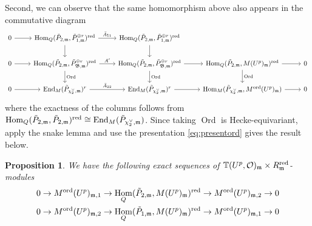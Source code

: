 \documentclass[leqno]{amsart}
\newtheorem{prop}[thm]{Proposition}
\theoremstyle{definition}
\theoremstyle{remark}
\newcommand{\oo}{\mathcal{O}}
\DeclareMathOperator{\End}{End}
\DeclareMathOperator{\Hom}{Hom}
\newcommand{\fm}{\mathfrak{m}}
\DeclareMathOperator{\Ord}{Ord} %
\newcommand{\B}{\mathfrak B} %
\newcommand{\red}{\textnormal{red}}
\newcommand{\TT}{\mathbb{T}} %
\newcommand{\ord}{\textnormal{ord}} %
\begin{document}
Second, we can observe that the same homomorphism 
above also appears in the commutative diagram 
\begin{equation*}
    \begin{tikzcd}
	    0 \arrow[r]& 
	    \Hom_{Q}(\tilde{P}_{2,\fm},\tilde{P}_{1,\fm}^{\oplus r})^{\red}
	    \arrow[r,"\bar{A}_{11}"] \arrow[d]&
	    \Hom_{Q}(\tilde{P}_{2,\fm}, \tilde{P}_{1,\fm}^{\oplus r})^{\red}
	    \arrow[d] &&\\
	    0\arrow[r] & 
	    \Hom_{Q}(\tilde{P}_{2,\fm},\tilde{P}_{\B,\fm}^{\oplus r})^{\red}
	    \arrow[r,"A'"] \arrow[d,"\Ord"] &
	    \Hom_{Q}(\tilde{P}_{2,\fm},\tilde{P}_{\B,\fm}^{\oplus r})^{\red}
	    \arrow[d,"\Ord"] \arrow[r]&
	    \Hom_{Q}(\tilde{P}_{2,\fm}, M(U^p)_{\fm})^{\red}\arrow[r]
        \arrow[d,"\Ord"] &0\\
	    0\arrow[r] & 
	    \End_{M}(\tilde{P}_{\chi_2^\vee,\fm})^{r}
	    \arrow[r,"\bar{A}_{22}"] &
	    \End_{M}(\tilde{P}_{\chi_2^\vee,\fm})^{r}
        \arrow[r]&
        \Hom_{M}(\tilde{P}_{\chi_2^\vee,\fm}, M^{\ord}(U^p)_\fm)
        \arrow[r]&0
    \end{tikzcd}
\end{equation*}
where the exactness of the columns follows from 
$\Hom_{Q}(\tilde{P}_{2,\fm}, \tilde{P}_{2,\fm})^{\red}
\cong \End_{M}(\tilde{P}_{\chi_2^\vee,\fm})$.
Since taking $\Ord$ is Hecke-equivariant,
apply the snake lemma and use the presentation \eqref{eq:presentord}
gives the result below.
\begin{prop}\label{cor:fil_by_ord}
	We have the following exact sequences of
	$\TT(U^p,\oo)_\fm\times R_{\fm}^{\red}$-modules
\begin{equation*}
\begin{aligned}
	0\to M^{\ord}(U^p)_{\fm,1}\to
	\Hom_{Q}(\tilde{P}_{2,\fm},M(U^p)_{\fm})^{\red}
    \to
	M^{\ord}(U^p)_{\fm,2}\to0\\
	0\to M^{\ord}(U^p)_{\fm,2}\to
	\Hom_{Q}(\tilde{P}_{1,\fm},M(U^p)_{\fm})^{\red}
    \to
	M^{\ord}(U^p)_{\fm,1}\to0
\end{aligned}
\end{equation*}
\end{prop}
\end{document}
